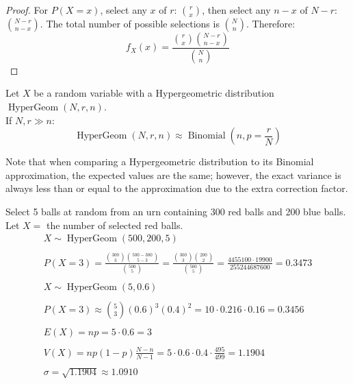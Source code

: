 \documentclass[letterpaper,12pt,fleqn]{article}
\DeclareMathOperator{\hg}{HyperGeom}
\DeclareMathOperator{\bin}{Binomial}
\renewcommand{\o}{\sigma}
\begin{document}
\begin{proof}
  For \(P(X=x)\), select any \(x\) of \(r\): \(\binom{r}{x}\), then select any \(n-x\) of \(N-r\): \(\binom{N-r}{n-x}\).  The
  total number of possible selections is \(\binom{N}{n}\).  Therefore:
  \[f_X(x)=\frac{\binom{r}{x}\binom{N-r}{n-x}}{\binom{N}{n}}\]
\end{proof}

\begin{theorem}
  Let \(X\) be a random variable with a Hypergeometric distribution \(\hg(N,r,n)\). \\
  If \(N,r\gg n\):
  \[\hg(N,r,n)\approx\bin\left(n,p=\frac{r}{N}\right)\]
\end{theorem}

Note that when comparing a Hypergeometric distribution to its Binomial approximation, the expected values are the same;
however, the exact variance is always less than or equal to the approximation due to the extra correction factor.

\begin{example}
  Select 5 balls at random from an urn containing 300 red balls and 200 blue balls.  Let \(X=\) the number of selected red
  balls.
  \begin{gather*}
    X\sim\hg(500,200,5) \\
    \\
    P(X=3)=\frac{\binom{300}{3}\binom{500-300}{5-3}}{\binom{500}{5}}=
    \frac{\binom{300}{3}\binom{200}{2}}{\binom{500}{5}}=\frac{4455100\cdot19900}{255244687600}=0.3473 \\
    \\
    X\sim\hg(5,0.6) \\
    \\
    P(X=3)\approx\binom{5}{3}(0.6)^3(0.4)^2=10\cdot0.216\cdot0.16=0.3456 \\
    \\
    E(X)=np=5\cdot0.6=3 \\
    \\
    V(X)=np(1-p)\frac{N-n}{N-1}=5\cdot0.6\cdot0.4\cdot\frac{495}{499}=1.1904 \\
    \\
    \o=\sqrt{1.1904}\approx1.0910
  \end{gather*}
\end{example}
\end{document}
